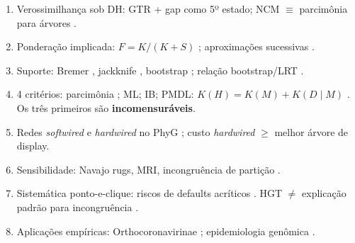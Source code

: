 \begin{revise}
\begin{enumerate}[itemsep=0pt, topsep=0pt, parsep=0pt]
    \item Verossimilhança sob DH: GTR + gap como 5º estado; NCM $\equiv$ parcimônia para árvores \parencite{tuffleysteel1997}.
    \item Ponderação implicada: $F = K/(K+S)$ \parencite{goloboff1993b,goloboff2013}; aproximações sucessivas \parencite{farris1969}.
    \item Suporte: Bremer \parencite{bremer1988}, jackknife \parencite{farrisetal1996}, bootstrap \parencite{felsenstein1985}; relação bootstrap/LRT \parencite{jacobmachado2021d}.
    \item 4 critérios: parcimônia \parencite{farris1983}; ML; IB; PMDL: $K(H) = K(M) + K(D\mid M)$ \parencite{wheelervaron2025}. Os três primeiros são \textbf{incomensuráveis}.
    \item Redes \textit{softwired} e \textit{hardwired} no PhyG \parencite{wheeleretal2024}; custo \textit{hardwired} $\geq$ melhor árvore de display.
    \item Sensibilidade: Navajo rugs, MRI, incongruência de partição \parencite{wheeleretal2006,wheeler1995,morrisonellis1997}.
    \item Sistemática ponto-e-clique: riscos de defaults acríticos \parencite{grant2003}. HGT $\neq$ explicação padrão para incongruência \parencite{wheeler2012}.
    \item Aplicações empíricas: Orthocoronavirinae \parencite{jacobmachado2021a}; epidemiologia genômica \parencite{jacobmachado2021b}.
\end{enumerate}
\end{revise}

\clearpage

\printbibliography[heading=subbibliography,title={Referências}]
